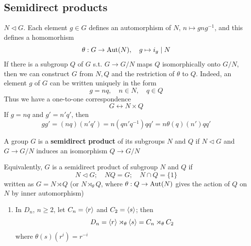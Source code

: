 \documentclass[11pt]{article}
\begin{document}
\subsection{Semidirect products}
\label{sec:orgced48ae}
\(N\lhd G\). Each element \(g\in G\) defines an automorphism of \(N\), \(n\mapsto gng^{-1}\), and this
defines a homomorhism
\begin{equation*}
\theta:G\to\operatorname{\text{Aut}}(N),\quad g\mapsto i_g\mid N
\end{equation*}
If there is a subgroup \(Q\) of \(G\) s.t. \(G\to G/N\) maps \(Q\) isomorphically onto \(G/N\),
then we can construct \(G\) from \(N,Q\) and the restriction of \(\theta\) to \(Q\). Indeed, an
element \(g\) of \(G\) can be written uniquely in the form
\begin{equation*}
g=nq,\quad n\in N,\quad q\in Q
\end{equation*}
Thus we have a one-to-one correspondence
\begin{equation*}
G\leftrightarrow N\times Q
\end{equation*}
If \(g=nq\) and \(g'=n'q'\), then
\begin{equation*}
gg'=(nq)(n'q')=n(qn'q^{-1})qq'=n\theta(q)(n')qq'
\end{equation*}

\begin{definition}[]
A group \(G\) is a \textbf{semidirect product} of its subgroups \(N\) and \(Q\) if \(N\lhd G\)
and \(G\to G/N\) induces an isomorphism \(Q\to G/N\)
\end{definition}

Equivalently, \(G\) is a semidirect product of subgroup \(N\) and \(Q\) if
\begin{equation*}
N\lhd G;\quad NQ=G;\quad N\cap Q=\{1\}
\end{equation*}
written as \(G=N\rtimes Q\) (or \(N\rtimes_\theta Q\), where \(\theta:Q\to\operatorname{\text{Aut}}(N)\) gives the action
of \(Q\) on \(N\) by inner automorphism)

\begin{examplle}[]
\begin{enumerate}
\item In \(D_n\), \(n\ge 2\), let \(C_n=\langle r\rangle\) and \(C_2=\langle s\rangle\); then
\begin{equation*}
D_n=\langle r\rangle\rtimes_\theta\langle s\rangle=C_n\rtimes_\theta C_2
\end{equation*}
where \(\theta(s)(r^i)=r^{-i}\)
\end{enumerate}
\end{examplle}
\end{document}
